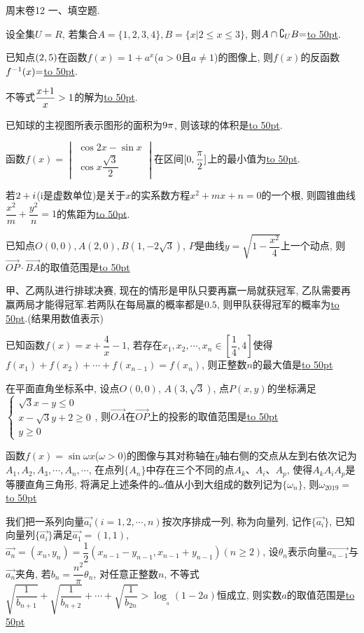 \documentclass[10pt,a4paper]{article}
\newcommand{\blank}[1]{\underline{\hbox to #1pt{}}}
\begin{document}
周末卷12
一、填空题.
\item 设全集$U=R$, 若集合$A=\{1,2,3,4\},B=\{x|2\le x\le 3\}$, 则$A\cap \complement _UB\text=$\blank{50}.
\item 已知点$(\text2,\text5)$在函数$f(x)=1+a^x$($a>0$且$a\ne 1$)的图像上, 则$f(x)$的反函数$f^{-1}(x)\text=$\blank{50}.
\item 不等式$\dfrac{x\text+1}x>1$的解为\blank{50}.
\item 已知球的主视图所表示图形的面积为$\text9\pi$, 则该球的体积是\blank{50}.
\item 函数$f(x)=\begin{vmatrix}
\cos 2x  -\sin x  \\\cos x  \dfrac{\sqrt 3}2  \end{vmatrix}$在区间$[0,\dfrac{\pi }{\text2}]$上的最小值为\blank{50}.
\item 若$\text2+i$($\mathrm{i}$是虚数单位)是关于$x$的实系数方程$x^2+mx+n=0$的一个根, 则圆锥曲线$\dfrac{x^2}m+\dfrac{y^2}n=1$的焦距为\blank{50}.
\item 已知点$O(0,0),A(2,0),B(1,-2\sqrt 3)$, $P$是曲线$y=\sqrt {1-\dfrac{x^2}4}$上一个动点, 则$\overrightarrow{OP}\cdot \overrightarrow{BA}$的取值范围是\blank{50}
\item 甲、乙两队进行排球决赛, 现在的情形是甲队只要再赢一局就获冠军, 乙队需要再赢两局才能得冠军.若两队在每局赢的概率都是$0.5$, 则甲队获得冠军的概率为\blank{50}.(结果用数值表示)
\item 已知函数$f(x)=x+\dfrac 4x-1$, 若存在$x_1,x_2,\cdots ,x_n\in [\dfrac 14,4]$使得$f(x_1)+f(x_2)+\cdots +f(x_{n-1})=f(x_n)$, 则正整数$n$的最大值是\blank{50}
\item 在平面直角坐标系中, 设点$O(0,0)$, $A(3,\sqrt 3)$, 点$P(x,y)$的坐标满足$\begin{cases} \sqrt 3x-y\le 0 \\ x-\sqrt 3y+2\ge 0 \\ y\ge 0 \end{cases}$,
则$\overrightarrow{OA}$在$\overrightarrow{OP}$上的投影的取值范围是\blank{50}
\item 函数$f(x)=\sin \omega x$($\omega >0$)的图像与其对称轴在$y$轴右侧的交点从左到右依次记为$A_1,A_2,A_3,\cdots ,A_n,\cdots$, 在点列$\{A_n\}$中存在三个不同的点$A_k$、$A_i$、$A_p$, 使得\triangle $A_kA_iA_p$是等腰直角三角形, 将满足上述条件的$\omega$值从小到大组成的数列记为$\{\omega _n\}$, 则$\omega _{2019}=$\blank{50}
\item 我们把一系列向量$\overrightarrow{a_i}(i=1,2,\cdots ,n)$按次序排成一列, 称为向量列, 记作$\{\overrightarrow{a_i}\}$, 已知向量列$\{\overrightarrow{a_i}\}$满足$\overrightarrow{a_1}=(1,1)$, $\overrightarrow{a_n}=(x_n,y_n)=\dfrac 12(x_{n-1}-y_{n-1},x_{n-1}+y_{n-1})(n\ge 2)$, 设$\theta _n$表示向量$\overrightarrow{a_{n-1}}$与$\overrightarrow{a_n}$夹角, 若$b_n=\dfrac{n^2}{\pi }\theta _n$, 对任意正整数$n$, 不等式$\sqrt {\dfrac 1{b_{n+1}}}+\sqrt {\dfrac 1{b_{n+2}}}+\cdots +\sqrt {\dfrac 1{b_{2n}}}>\log__a(1-2a)$恒成立, 则实数$a$的取值范围是\blank{50}
\end{document}
